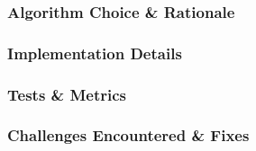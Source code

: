\subsubsection{Algorithm Choice \& Rationale}
\subsubsection{Implementation Details}
\subsubsection{Tests \& Metrics}
\subsubsection{Challenges Encountered \& Fixes}